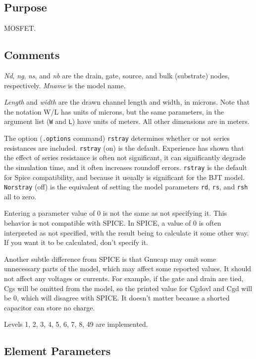 \subsection{Purpose}

MOSFET.
\subsection{Comments}

{\it Nd}, {\it ng}, {\it ns}, and {\it nb} are the drain, gate,
source, and bulk (substrate) nodes, respectively.  {\it Mname} is the
model name.

{\it Length} and {\it width} are the drawn channel length and width, in
microns.  Note that the notation W/L has units of microns, but the same
parameters, in the argument list ({\tt W} and {\tt L}) have units of meters.
All other dimensions are in meters.

The option ({\tt .options} command) {\tt rstray} determines whether or
not series resistances are included.  {\tt rstray} (on) is the
default.  Experience has shown that the effect of series resistance is
often not significant, it can significantly degrade the simulation
time, and it often increases roundoff errors.  {\tt rstray} is the
default for Spice compatibility, and because it usually is significant
for the BJT model.  {\tt Norstray} (off) is the equivalent of setting
the model parameters {\tt rd}, {\tt rs}, and {\tt rsh} all to zero.

Entering a parameter value of 0 is not the same as not specifying
it.  This behavior is not compatible with SPICE.  In SPICE, a value
of 0 is often interpreted as not specified, with the result being
to calculate it some other way.  If you want it to be calculated,
don't specify it.

Another subtle difference from SPICE is that Gnucap may omit some
unnecessary parts of the model, which may affect some reported
values.  It should not affect any voltages or currents.  For example,
if the gate and drain are tied, Cgs will be omitted from the model,
so the printed value for Cgdovl and Cgd will be 0, which will
disagree with SPICE.  It doesn't matter because a shorted capacitor
can store no charge.

Levels 1, 2, 3, 4, 5, 6, 7, 8, 49 are implemented.
\subsection{Element Parameters}

